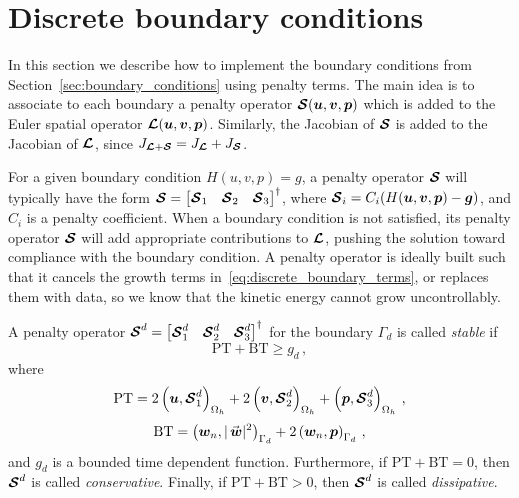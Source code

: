 \section{Discrete boundary conditions}%
\label{sec:discrete_boundary_conditions}
In this section we describe how to implement the boundary conditions from Section~\ref{sec:boundary_conditions} using penalty terms. The main idea is to associate to each boundary a penalty operator $\bm{\mathcal{S}}(\bm{u}, \bm{v}, \bm{p})$ which is added to the Euler spatial operator $\bm{\mathcal{L}}(\bm{u}, \bm{v}, \bm{p})$. Similarly, the Jacobian of $\bm{\mathcal{S}}$ is added to the Jacobian of $\bm{\mathcal{L}}$, since $J_{\bm{\mathcal{L}}+\bm{\mathcal{S}}} = J_{\bm{\mathcal{L}}} + J_{\bm{\mathcal{S}}}$.

For a given boundary condition $H(u,v,p) = g$, a penalty operator $\bm{\mathcal{S}}$ will typically have the form
$
  \bm{\mathcal{S}} =
  \begin{bmatrix}
    \bm{\mathcal{S}}_1 & \bm{\mathcal{S}}_2 & \bm{\mathcal{S}}_3
  \end{bmatrix}^\dagger
$,
where
$
  \bm{\mathcal{S}}_i = C_i (H(\bm{u}, \bm{v}, \bm{p}) - \bm{g})
$,
and $C_i$ is a penalty coefficient. When a boundary condition is not satisfied, its penalty operator $\bm{\mathcal{S}}$ will add appropriate contributions to $\bm{\mathcal{L}}$, pushing the solution toward compliance with the boundary condition. A penalty operator is ideally built such that it cancels the growth terms in~\eqref{eq:discrete_boundary_terms}, or replaces them with data, so we know that the kinetic energy cannot grow uncontrollably.

\begin{definition}\label{def:stable_penalty}
  A penalty operator
  $
    \bm{\mathcal{S}}^d =
    \begin{bmatrix}
      \bm{\mathcal{S}}^d_1 & \bm{\mathcal{S}}^d_2 & \bm{\mathcal{S}}^d_3
    \end{bmatrix}^\dagger
  $
  for the boundary $\Gamma_d$ is called \emph{stable} if
  \begin{equation*}
    \text{PT} + \text{BT} \geq g_d \,,
  \end{equation*}
  where
  \begin{equation*}
    \text{PT} = 2\left(\bm{u}, \bm{\mathcal{S}}^d_1\right)_{\Omega_h} + 2\left(\bm{v}, \bm{\mathcal{S}}^d_2\right)_{\Omega_h} + \left(\bm{p}, \bm{\mathcal{S}}^d_3\right)_{\Omega_h} \,,
  \end{equation*}
  \begin{equation*}
    \text{BT} = \ipbn{\wnn}{|\wn|^2} + 2\ipbn{\wnn}{\pn} \,,
  \end{equation*}
  and $g_d$ is a bounded time dependent function. Furthermore, if $\text{PT} + \text{BT} = 0$, then $\bm{\mathcal{S}}^d$ is called \emph{conservative}. Finally, if $\text{PT} + \text{BT} > 0$, then $\bm{\mathcal{S}}^d$ is called \emph{dissipative}.
\end{definition}

